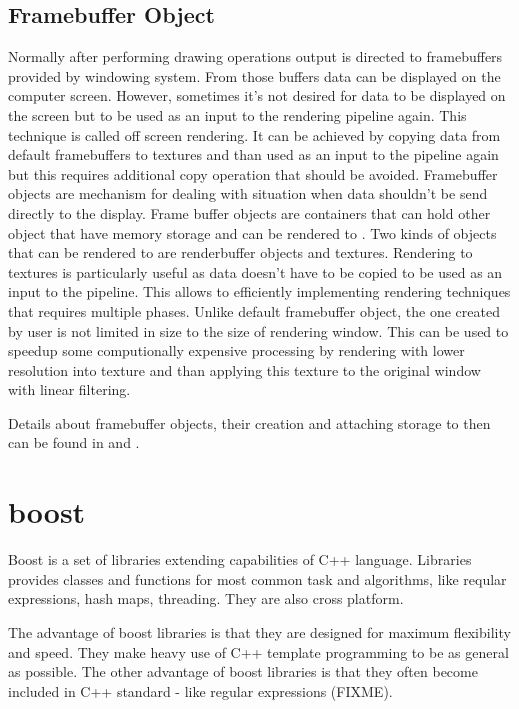 \subsection{Framebuffer Object}
Normally after performing drawing operations output is directed to framebuffers provided by windowing system. From those buffers data can be displayed on the computer screen. However, sometimes it's not desired for data to be displayed on the screen but to be used as an input to the rendering pipeline again. This technique is called off screen rendering. It can be achieved by copying data from default framebuffers to textures and than used as an input to the pipeline again but this requires additional copy operation that should be avoided. Framebuffer objects are mechanism for dealing with situation when data shouldn't be send directly to the display. Frame buffer objects are containers that can hold other object that have memory storage and can be rendered to \cite[chapter~8]{OpenGLSuperbible}. Two kinds of objects that can be rendered to are renderbuffer objects and textures. Rendering to textures is particularly useful as data doesn't have to be copied to be used as an input to the pipeline. This allows to efficiently implementing rendering techniques that requires multiple phases.
Unlike default framebuffer object, the one created by user is not limited in size to the size of rendering window. This can be used to speedup some computionally expensive processing by rendering with lower resolution into texture and than applying this texture to the original window with linear filtering. 

Details about framebuffer objects, their creation and attaching storage to then can be found in \cite[chapter~8]{OpenGLSuperbible} and \cite[chapter~10]{RedBook}.

\section{boost}
Boost is a set of libraries extending capabilities of C++ language. Libraries provides classes and functions for most common task and algorithms, like reqular expressions, hash maps, threading. They are also cross platform. 

The advantage of boost libraries is that they are designed for maximum flexibility and speed. They make heavy use of C++ template programming to be as general as possible. The other advantage of boost libraries is that they often become included in C++ standard - like regular expressions (FIXME). 

